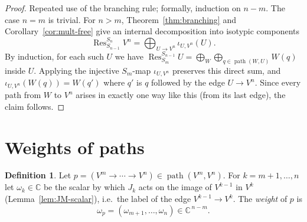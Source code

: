 \documentclass[11pt]{article}
\theoremstyle{definition}
\newtheorem{definition}[theorem]{Definition}
\theoremstyle{remark}
\newcommand{\C}{\mathbb{C}}
\DeclareMathOperator{\Res}{Res}
\DeclareMathOperator{\pth}{path}   %
\begin{document}
\begin{proof}
Repeated use of the branching rule; formally, induction on $n-m$. The case
$n=m$ is trivial. For $n>m$, Theorem~\ref{thm:branching} and
Corollary~\ref{cor:mult-free} give an internal decomposition into isotypic
components
\[
  \Res^{S_n}_{S_{n-1}}V^n=\bigoplus_{U\to V^n}\iota_{U,V^n}(U).
\]
By induction, for each such $U$ we have
$\Res^{S_{n-1}}_{S_m}U=\bigoplus_{W}\bigoplus_{q\in\pth(W,U)}W(q)$ inside $U$.
Applying the injective $S_m$-map $\iota_{U,V^n}$ preserves this direct sum,
and $\iota_{U,V^n}(W(q))=W(q')$ where $q'$ is $q$ followed by the edge
$U\to V^n$. Since every path from $W$ to $V^n$ arises in exactly one way like
this (from its last edge), the claim follows.
\end{proof}

\section{Weights of paths}

\begin{definition}
Let $p=(V^m\to\cdots\to V^n)\in\pth(V^m,V^n)$. For $k=m+1,\dots,n$ let
$\omega_k\in\C$ be the scalar by which $J_k$ acts on the image of $V^{k-1}$ in
$V^k$ (Lemma~\ref{lem:JM-scalar}), i.e.\ the label of the edge
$V^{k-1}\to V^k$. The \emph{weight} of $p$ is
\[
  \omega_p=(\omega_{m+1},\dots,\omega_n)\in\C^{\,n-m}.
\]
\end{definition}
\end{document}
